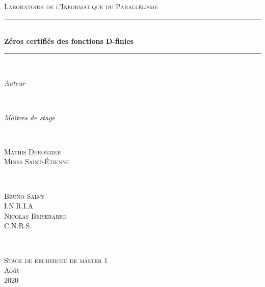 \documentclass[a4paper,10pt]{article}
\begin{document}
	\hypersetup{pdfborder=0 0 0}
	\newcommand{\HRule}{\rule{\linewidth}{0.5mm}}
	\textsc{\LARGE Laboratoire de l'Informatique du Parallélisme}\\[1.5cm] 
	\HRule \\[0.5cm]
	{ \huge \bfseries Zéros certifiés des fonctions D-finies  }\\[0.4cm] 
	\HRule \\[1.5cm]
	
	\begin{minipage}{0.4\textwidth}
		\begin{flushleft} \Large
			\emph{Auteur}\\
		\end{flushleft}
	\end{minipage}
	~
	\begin{minipage}{0.4\textwidth}
		\begin{flushright} \Large
			\emph{Maîtres de stage} \\
		\end{flushright}
	\end{minipage}\\[0.5 cm]
	\begin{minipage}{0.4\textwidth}
		\begin{flushleft} \large
			\textsc{Mathis Deronzier}\\
			\textsc{Mines Saint-Étienne}
		\end{flushleft}
	\end{minipage}
	~
	\begin{minipage}{0.4\textwidth}
		\begin{flushright} \large
			\textsc{Bruno Salvy}\\
			\textsc{I.N.R.I.A}\\
			\textsc{Nicolas Brisebarre }\\
			\textsc{C.N.R.S.}
		\end{flushright}
	\end{minipage}\\[2cm]
	\begin{center}
	\textsc{\Large Stage de recherche de master 1 }\\[0.5cm]  
	\large Août \\2020\\[2cm]
	\end{center}
	\renewcommand{\contentsname}{Sommaire}
	\newpage
	\tableofcontents
	\newpage
	\renewcommand {\algorithmicrequire } {\textbf{\textsc{Entrée(s):} } }
	\renewcommand {\algorithmicensure } {\textbf{\textsc{Sortie:} } }
	\renewcommand {\algorithmicwhile } {\textbf{Tant que} }
	\renewcommand {\algorithmicdo } {\textbf{faire} }
	\renewcommand {\algorithmicendwhile } {\textbf{fin du Tant que} }
	\renewcommand {\algorithmicif } {\textbf{Si} }
	\renewcommand {\algorithmicfor } {\textbf{Pour} }
	\renewcommand {\algorithmicendfor } {\textbf{fin du Pour} }
	\renewcommand {\algorithmicthen } {\textbf{alors} }
	\renewcommand {\algorithmicendif } {\textbf{fin du Si} }
	\renewcommand {\algorithmicelse } {\textbf{Sinon} }
	\renewcommand {\algorithmicreturn } {\textbf{Renvoyer} }
	\newtheorem{theorem}{Théorème}[section] 
	\newtheorem{conjecture}{Conjecture}
	\newtheorem{proposition}{Proposition}
	\newtheorem{corollaire}{Corollaire}
	\newtheorem{definition}{Définition}
	\newtheorem{remarque}{Remarque}
	\setcounter{section}{-1}
\end{document}
